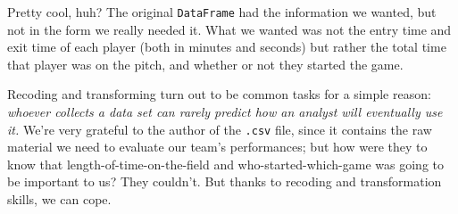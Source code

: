 Pretty cool, huh? The original \texttt{DataFrame} had the information we
wanted, but not in the form we really needed it. What we wanted was not the
entry time and exit time of each player (both in minutes and seconds) but
rather the total time that player was on the pitch, and whether or not they
started the game.

Recoding and transforming turn out to be common tasks for a simple reason:
\textit{whoever collects a data set can rarely predict how an analyst will
eventually use it.} We're very grateful to the author of the \texttt{.csv}
file, since it contains the raw material we need to evaluate our team's
performances; but how were they to know that length-of-time-on-the-field and
who-started-which-game was going to be important to us? They couldn't. But
thanks to recoding and transformation skills, we can cope.

